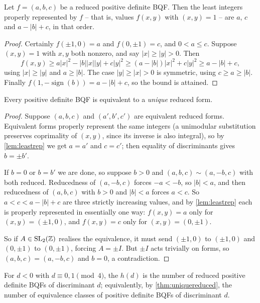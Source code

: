 \documentclass[a4paper]{scrartcl}
\begin{document}
\begin{lemma}\label{lem:leastrep}
	Let $f = (a,b,c)$ be a reduced positive definite BQF. Then the least integers properly represented by $f$ -- that is, values $f(x,y)$ with $(x,y) = 1$ -- are $a$, $c$ and $a - |b| + c$, in that order.
\end{lemma}
\begin{proof}
	Certainly $f(\pm 1, 0) = a$ and $f(0, \pm 1) = c$, and $0 < a \leq c$. Suppose $(x,y) = 1$ with $x, y$ both nonzero, and say $|x| \geq |y| > 0$. Then
	$$
	f(x,y) \geq a|x|^2 - |b||x||y| + c|y|^2 \geq (a - |b|)|x|^2 + c|y|^2 \geq a - |b| + c,
	$$
	using $|x| \geq |y|$ and $a \geq |b|$. The case $|y| \geq |x| > 0$ is symmetric, using $c \geq a \geq |b|$. Finally $f(1, -\operatorname{sign}(b)) = a - |b| + c$, so the bound is attained.
\end{proof}

\begin{theorem}\label{thm:uniquereduced}
	Every positive definite BQF is equivalent to a \emph{unique} reduced form.
\end{theorem}
\begin{proof}
	Suppose $(a,b,c)$ and $(a',b',c')$ are equivalent reduced forms. Equivalent forms properly represent the same integers (a unimodular substitution preserves coprimality of $(x,y)$, since its inverse is also integral), so by \autoref{lem:leastrep} we get $a = a'$ and $c = c'$; then equality of discriminants gives $b = \pm b'$.

	If $b = 0$ or $b = b'$ we are done, so suppose $b > 0$ and $(a,b,c) \sim (a,-b,c)$ with both reduced. Reducedness of $(a,-b,c)$ forces $-a < -b$, so $|b| < a$, and then reducedness of $(a,b,c)$ with $b>0$ and $|b|<a$ forces $a < c$. So $a < c < a - |b| + c$ are three strictly increasing values, and by \autoref{lem:leastrep} each is properly represented in essentially one way: $f(x,y) = a$ only for $(x,y) = (\pm1, 0)$, and $f(x,y) = c$ only for $(x,y) = (0,\pm1)$.

	So if $A \in \operatorname{SL}_2(\mathbb{Z})$ realises the equivalence, it must send $(\pm 1, 0)$ to $(\pm 1, 0)$ and $(0, \pm 1)$ to $(0, \pm1)$, forcing $A = \pm I$. But $\pm I$ acts trivially on forms, so $(a,b,c) = (a,-b,c)$ and $b = 0$, a contradiction.
\end{proof}

\begin{definition}
	For $d < 0$ with $d \equiv 0, 1 \pmod 4$, the  $h(d)$ is the number of reduced positive definite BQFs of discriminant $d$; equivalently, by \autoref{thm:uniquereduced}, the number of equivalence classes of positive definite BQFs of discriminant $d$.
\end{definition}
\end{document}
